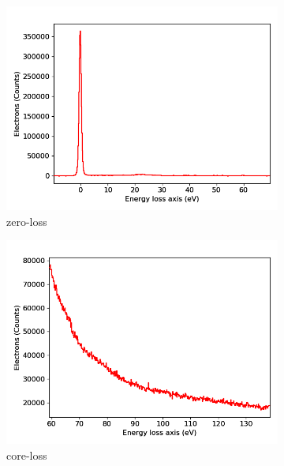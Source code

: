 	\begin{figure}[H]
		\centering
	\begin{subfigure}[b]{0.45\textwidth}
				\includegraphics[width= 1 \linewidth]{img/tem_zeroloss}
				\caption{zero-loss}
	\end{subfigure}
	\begin{subfigure}[b]{0.45\textwidth}
				\includegraphics[width= 1 \linewidth]{img/tem_coreloss}
				\caption{core-loss}
	\end{subfigure}
	\begin{subfigure}[b]{0.7\textwidth}

\end{subfigure}
\end{figure}
